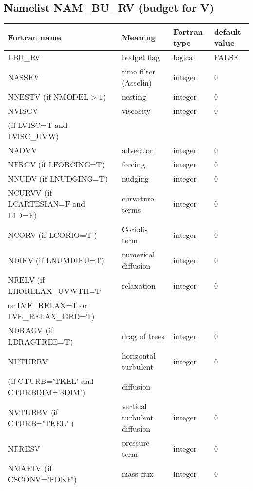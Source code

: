\subsection{Namelist NAM\_BU\_RV (budget for V)}

\begin{longtable} {|p{}|p{}|>{\centering}p{}|p{}<{\centering}|}
\hline
Fortran name & Meaning & Fortran type & default value \\
\hline \hline
\endhead
LBU\_RV  & budget flag & logical & FALSE \index{LBU\_RV!\innam{NAM\_BU\_RV}}\\\hline
NASSEV   & time filter (Asselin)   & integer  &  0 \index{NASSEV!\innam{NAM\_BU\_RV}} \\\hline
NNESTV (if NMODEL$>1$)  & nesting           & integer  &  0 \index{NNESTV!\innam{NAM\_BU\_RV}} \\\hline
NVISCV   & viscosity         & integer  &  0 \index{NVISCV!\innam{NAM\_BU\_RV}}\\
(if LVISC=T and LVISC\_UVW) &  &   &   \\\hline
NADVV   & advection  & integer  &  0  \index{NADVV!\innam{NAM\_BU\_RV}}\\\hline
NFRCV (if LFORCING=T)  & forcing           & integer  &  0 \index{NFRCV!\innam{NAM\_BU\_RV}} \\\hline
NNUDV (if LNUDGING=T)   & nudging           & integer  &  0 \index{NNUDV!\innam{NAM\_BU\_RV}} \\\hline
NCURVV (if LCARTESIAN=F and L1D=F)  & curvature terms   & integer  &  0 \index{NCURVV!\innam{NAM\_BU\_RV}}\\\hline
NCORV (if LCORIO=T )   & Coriolis  term    & integer  &  0 \index{NCORV!\innam{NAM\_BU\_RV}}\\\hline
NDIFV (if LNUMDIFU=T)   & numerical diffusion & integer  &  0 \index{NDIFV!\innam{NAM\_BU\_RV}}\\\hline
NRELV  (if LHORELAX\_UVWTH=T  & relaxation & integer  &  0 \index{NRELV!\innam{NAM\_BU\_RV}}\\ \nopagebreak
or LVE\_RELAX=T or LVE\_RELAX\_GRD=T) &  &   &   \\\hline
NDRAGV (if LDRAGTREE=T) & drag of trees & integer  &  0 \index{NDRAGV!\innam{NAM\_BU\_RV}} \\\hline
NHTURBV  & horizontal turbulent & integer  &  0 \index{NHTURBV!\innam{NAM\_BU\_RV}}\\ \nopagebreak
(if CTURB='TKEL' and CTURBDIM='3DIM') &diffusion &   &  \\\hline
NVTURBV (if CTURB='TKEL' ) & vertical turbulent diffusion & integer  &  0 \index{NVTURBV!\innam{NAM\_BU\_RV}}\\\hline
NPRESV   & pressure term       & integer  &  0 \index{NPRESV!\innam{NAM\_BU\_RV}}    \\\hline
NMAFLV (if CSCONV='EDKF')   & mass flux        & integer  &  0 \index{NMAFLV!\innam{NAM\_BU\_RV}}\\\hline
\end{longtable}

